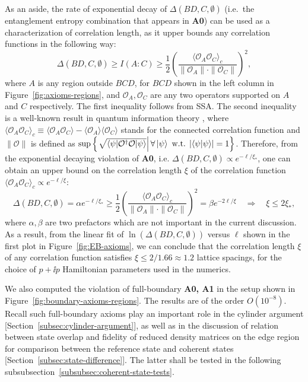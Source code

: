 \documentclass[12pt, nofootinbib]{article}
\theoremstyle{plain}
\theoremstyle{assumption}
\theoremstyle{definition}
\theoremstyle{plain}
\theoremstyle{plain}
\theoremstyle{plain}
\theoremstyle{plain}
\theoremstyle{plain}
\newcommand{\calO}{{\mathcal O}}
\begin{document}
As an aside, the rate of exponential decay of $\Delta(BD,C,\emptyset)$ (i.e.~the entanglement entropy combination that appears in \textbf{A0}) can be used as a characterization of correlation length, as it upper bounds any correlation functions in the following way:
\begin{equation}
    \Delta(BD,C,\emptyset)\geq I(A:C)\geq \frac{1}{2}\left( \frac{\langle \calO_A \calO_C\rangle_c}{\| \calO_A \| \cdot \|\calO_C \|} \right)^2, 
\end{equation}
where $A$ is any region outside $BCD$, for $BCD$ shown in the left column in Figure~\ref{fig:axioms-regions}, and $\calO_A,\calO_C$ are any two operators supported on $A$ and $C$ respectively. The first inequality follows from SSA. 
The second inequality is a well-known result in quantum information theory \cite{Wolf:2007tdq}, where $\langle \calO_A\calO_C\rangle_c \equiv \langle \calO_A \calO_C\rangle - \langle \calO_A\rangle \langle \calO_C\rangle $ stands for the connected correlation function and $\|\calO\|$ is defined as  $ \mathrm{sup}\left\{ \left. \sqrt{\langle \psi| \calO^{\dagger} \calO|\psi\rangle}\right|\forall \ket{\psi} \text{ w.t. }|\langle \psi |\psi\rangle| = 1 \right\}$. Therefore, from the exponential decaying violation of \textbf{A0}, i.e. $\Delta(BD,C,\emptyset) \propto e^{-\ell/\xi_*}$, one can obtain an upper bound on the correlation length $\xi$ of the correlation function $\langle \calO_A\calO_C\rangle_c \propto e^{-\ell/\xi}$: 
\begin{equation}\label{eq:corr-length}
    \Delta(BD,C,\emptyset) = \alpha e^{-\ell/\xi_*} \geq \frac{1}{2}\left( \frac{\langle \calO_A \calO_C\rangle_c}{\| \calO_A \| \cdot \|\calO_C \|} \right)^2 = \beta e^{-2\ell/\xi} \quad \Rightarrow \quad 
    \xi\leq 2\xi_*,  
\end{equation}
where $\alpha,\beta$ are two prefactors which are not important in the current discussion. As a result, from the linear fit of $\ln(\Delta(BD,C,\emptyset))$ versus $\ell$ shown in the first plot in Figure~\ref{fig:EB-axioms}, we can conclude that the correlation length $\xi$ of any correlation function satisfies $ \xi \le 2/1.66 \approx 1.2$ lattice spacings, for the choice of $p+\ii p$ Hamiltonian parameters used in the numerics.    

We also computed the violation of full-boundary {\bf A0, A1} in the setup shown in Figure~\ref{fig:boundary-axioms-regions}. 
The results are of the order $O(10^{-8})$. Recall such full-boundary axioms play an important role in the cylinder argument [Section~\ref{subsec:cylinder-argument}], as well as in the discussion of relation between state overlap and fidelity of reduced density matrices on the edge region for comparison between the reference state and coherent states [Section~\ref{subsec:state-difference}]. The latter shall be tested in the following subsubsection~\ref{subsubsec:coherent-state-tests}. 
\end{document}
